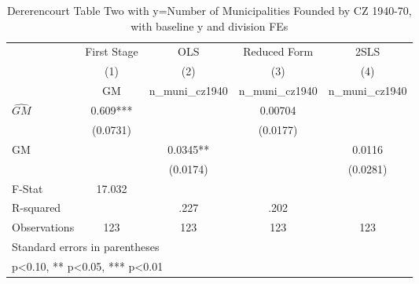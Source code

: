 \begin{table}[htbp]\centering
\def\sym#1{\ifmmode^{#1}\else\(^{#1}\)\fi}
\caption{Dererencourt Table Two with y=Number of Municipalities Founded by CZ 1940-70, with baseline y and division FEs}
\begin{tabular}{l*{4}{c}}
\toprule
                    & First Stage   &         OLS   &Reduced Form   &        2SLS   \\
                    &\multicolumn{1}{c}{(1)}&\multicolumn{1}{c}{(2)}&\multicolumn{1}{c}{(3)}&\multicolumn{1}{c}{(4)}\\
                    &\multicolumn{1}{c}{GM}&\multicolumn{1}{c}{n\_muni\_cz1940}&\multicolumn{1}{c}{n\_muni\_cz1940}&\multicolumn{1}{c}{n\_muni\_cz1940}\\
\midrule
$\hat{GM}$          &       0.609***&               &     0.00704   &               \\
                    &    (0.0731)   &               &    (0.0177)   &               \\
\addlinespace
GM                  &               &      0.0345** &               &      0.0116   \\
                    &               &    (0.0174)   &               &    (0.0281)   \\
\midrule
F-Stat              &      17.032   &               &               &               \\
R-squared           &               &        .227   &        .202   &               \\
Observations        &         123   &         123   &         123   &         123   \\
\bottomrule
\multicolumn{5}{l}{\footnotesize Standard errors in parentheses}\\
\multicolumn{5}{l}{\footnotesize * p<0.10, ** p<0.05, *** p<0.01}\\
\end{tabular}
\end{table}
